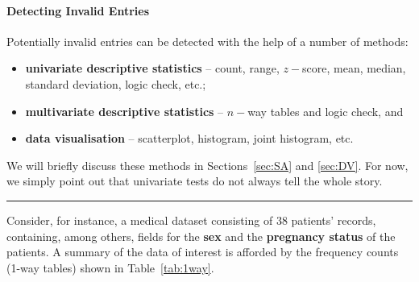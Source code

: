 \paragraph{Detecting Invalid Entries}
Potentially invalid entries can be detected with the help of a number of methods: 
\begin{itemize}[noitemsep]
    \item \textbf{univariate descriptive statistics} -- count, range, $z-$score, mean, median, standard deviation, logic check, etc.;
    \item \textbf{multivariate descriptive statistics} -- $n-$way tables and logic check, and \item \textbf{data visualisation} -- scatterplot, histogram, joint histogram, etc.
\end{itemize} 
We will briefly discuss these methods in Sections~\ref{sec:SA} and \ref{sec:DV}. For now, we simply point out that univariate tests do not always tell the whole story. 
\begin{center}
    \rule{0.5\textwidth}{.4pt}
\end{center}
Consider, for instance, a medical dataset consisting of 38 patients' records, containing, among others, fields for the \textbf{sex} and the \textbf{pregnancy status} of the patients. A summary of the data of interest is afforded by the frequency counts (1-way tables) shown in Table~\ref{tab:1way}.
